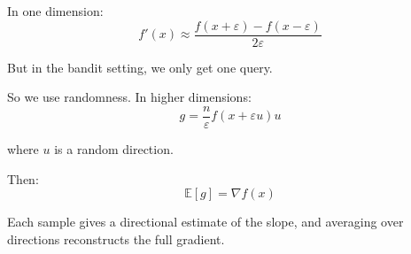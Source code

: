 \documentclass{article}
\begin{document}
In one dimension:
\[
f'(x) \approx \frac{f(x+\varepsilon) - f(x-\varepsilon)}{2\varepsilon}
\]

But in the bandit setting, we only get one query.

So we use randomness. In higher dimensions:
\[
g = \frac{n}{\varepsilon} f(x+\varepsilon u) u
\]

where $u$ is a random direction.

Then:
\[
\mathbb{E}[g] = \nabla f(x)
\]

Each sample gives a directional estimate of the slope, and averaging over directions reconstructs the full gradient.
\end{document}

